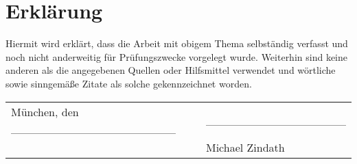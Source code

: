 \chapter*{Erklärung}

Hiermit wird erklärt, dass die Arbeit mit obigem Thema selbständig verfasst und noch nicht anderweitig für Prüfungszwecke vorgelegt wurde. Weiterhin sind keine anderen als die angegebenen Quellen oder Hilfsmittel verwendet und wörtliche sowie sinngemäße Zitate als solche gekennzeichnet worden. \\[2cm]
\begin{tabularx}{\textwidth}{lX}
 München, den \_\_\_\_\_\_\_\_\_\_\_\_\_\_\_\_\_\_\_\_ \hspace{10 mm} & \_\_\_\_\_\_\_\_\_\_\_\_\_\_\_\_\_ \\[0.2cm]
 & \hspace{5 mm} {\footnotesize Michael Zindath}
\end{tabularx}


